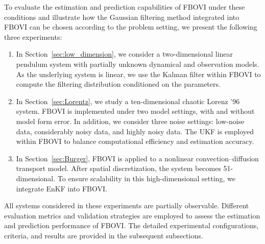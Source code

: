\documentclass[preprint,3p,times]{elsarticle}
\begin{document}
To evaluate the estimation and prediction capabilities of FBOVI under these conditions and illustrate how the Gaussian filtering method integrated into FBOVI can be chosen according to the problem setting, we present the following three experiments:

\begin{enumerate}
\item In Section~\ref{sec:low_dimension}, we consider a two-dimensional linear pendulum system with partially unknown dynamical and observation models. As the underlying system is linear, we use the Kalman filter within FBOVI to compute the filtering distribution conditioned on the parameters. 
\item In Section~\ref{sec:Lorentz}, we study a ten-dimensional chaotic Lorenz '96 system. FBOVI is implemented under two model settings, with and without model form error. In addition, we consider three noise settings: low-noise data, considerably noisy data, and highly noisy data.  The UKF is employed within FBOVI to balance computational efficiency and estimation accuracy. 
\item In Section~\ref{sec:Burger}, FBOVI is applied to a nonlinear convection–diffusion transport model. After spatial discretization, the system becomes 51-dimensional. To ensure scalability in this high-dimensional setting, we integrate EnKF into FBOVI. 
\end{enumerate}

All systems considered in these experiments are partially observable. Different evaluation metrics and validation strategies are employed to assess the estimation and prediction performance of FBOVI. The detailed experimental configurations, criteria, and results are provided in the subsequent subsections. 
\end{document}
